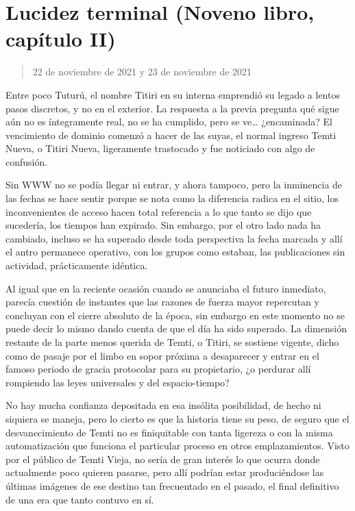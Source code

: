 \documentclass[
  spanish,
]{book}
\begin{document}
\hypertarget{lucidez-terminal-noveno-libro-capuxedtulo-ii}{%
\section{Lucidez terminal (Noveno libro, capítulo II)}\label{lucidez-terminal-noveno-libro-capuxedtulo-ii}}

\begin{quote}
22 de noviembre de 2021 y 23 de noviembre de 2021
\end{quote}

Entre poco Tuturú, el nombre Titiri en su interna emprendió su legado a lentos pasos discretos, y no en el exterior. La respuesta a la previa pregunta qué sigue aún no es íntegramente real, no se ha cumplido, pero se ve\ldots{} ¿encaminada? El vencimiento de dominio comenzó a hacer de las suyas, el normal ingreso Temti Nueva, o Titiri Nueva, ligeramente trastocado y fue noticiado con algo de confusión.

Sin WWW no se podía llegar ni entrar, y ahora tampoco, pero la inminencia de las fechas se hace sentir porque se nota como la diferencia radica en el sitio, los inconvenientes de acceso hacen total referencia a lo que tanto se dijo que sucedería, los tiempos han expirado. Sin embargo, por el otro lado nada ha cambiado, incluso se ha superado desde toda perspectiva la fecha marcada y allí el antro permanece operativo, con los grupos como estaban, las publicaciones sin actividad, prácticamente idéntica.

Al igual que en la reciente ocasión cuando se anunciaba el futuro inmediato, parecía cuestión de instantes que las razones de fuerza mayor repercutan y concluyan con el cierre absoluto de la época, sin embargo en este momento no se puede decir lo mismo dando cuenta de que el día ha sido superado. La dimensión restante de la parte menos querida de Temti, o Titiri, se sostiene vigente, dicho como de pasaje por el limbo en sopor próxima a desaparecer y entrar en el famoso periodo de gracia protocolar para su propietario, ¿o perdurar allí rompiendo las leyes universales y del espacio-tiempo?

No hay mucha confianza depositada en esa insólita posibilidad, de hecho ni siquiera se maneja, pero lo cierto es que la historia tiene su peso, de seguro que el desvanecimiento de Temti no es finiquitable con tanta ligereza o con la misma automatización que funciona el particular proceso en otros emplazamientos. Visto por el público de Temti Vieja, no sería de gran interés lo que ocurra donde actualmente poco quieren pasarse, pero allí podrían estar produciéndose las últimas imágenes de ese destino tan frecuentado en el pasado, el final definitivo de una era que tanto contuvo en sí.
\end{document}
